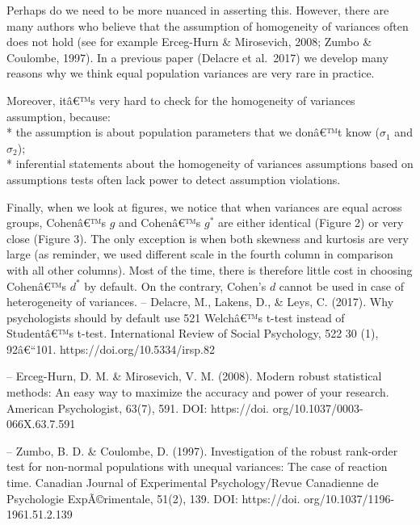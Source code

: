 \begin{appendix}
\color{blue} Perhaps do we need to be more nuanced in asserting this.
However, there are many authors who believe that the assumption of
homogeneity of variances often does not hold (see for example Erceg-Hurn
\& Mirosevich, 2008; Zumbo \& Coulombe, 1997). In a previous paper
(Delacre et al.~2017) we develop many reasons why we think equal
population variances are very rare in practice.

Moreover, itâ€™s very hard to check for the homogeneity of variances
assumption, because:\\
* the assumption is about population parameters that we donâ€™t know
(\(\sigma_1\) and \(\sigma_2\));\\
* inferential statements about the homogeneity of variances assumptions
based on assumptions tests often lack power to detect assumption
violations.

Finally, when we look at figures, we notice that when variances are
equal across groups, Cohenâ€™s \(g\) and Cohenâ€™s \(g^*\) are either
identical (Figure 2) or very close (Figure 3). The only exception is
when both skewness and kurtosis are very large (as reminder, we used
different scale in the fourth column in comparison with all other
columns). Most of the time, there is therefore little cost in choosing
Cohenâ€™s \(d^*\) by default. On the contrary, Cohen's \(d\) cannot be
used in case of heterogeneity of variances. -- Delacre, M., Lakens, D.,
\& Leys, C. (2017). Why psychologists should by default use 521
Welchâ€™s t-test instead of Studentâ€™s t-test. International Review of
Social Psychology, 522 30 (1), 92â€``101.
https://doi.org/10.5334/irsp.82

-- Erceg-Hurn, D. M. \& Mirosevich, V. M. (2008). Modern robust
statistical methods: An easy way to maximize the accuracy and power of
your research. American Psychologist, 63(7), 591. DOI: https://doi.
org/10.1037/0003-066X.63.7.591

-- Zumbo, B. D. \& Coulombe, D. (1997). Investigation of the robust
rank-order test for non-normal populations with unequal variances: The
case of reaction time. Canadian Journal of Experimental Psychology/Revue
Canadienne de Psychologie ExpÃ©rimentale, 51(2), 139. DOI: https://doi.
org/10.1037/1196-1961.51.2.139

\color{black}


\end{appendix}
